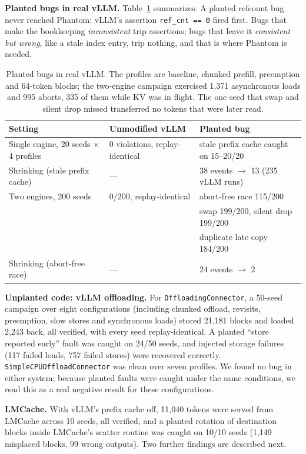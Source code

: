 \documentclass[10pt]{article}
\newcommand{\code}[1]{\texttt{\small #1}}
\begin{document}
\textbf{Planted bugs in real vLLM.} Table~\ref{tab:vllm} summarizes. A
planted refcount bug never reached Phantom: vLLM's assertion
\code{ref\_cnt == 0} fired first. Bugs that make the bookkeeping
\emph{inconsistent} trip assertions; bugs that leave it \emph{consistent but
wrong}, like a stale index entry, trip nothing, and that is where Phantom is
needed.

\begin{table}[h]
\centering\small
\begin{tabular}{lll}
\toprule
Setting & Unmodified vLLM & Planted bug \\
\midrule
Single engine, 20 seeds $\times$ 4 profiles & 0 violations, replay-identical & stale prefix cache caught on 15--20/20 \\
Shrinking (stale prefix cache) & --- & 38 events $\to$ 13 (235 vLLM runs) \\
Two engines, 200 seeds & 0/200, replay-identical & abort-free race 115/200 \\
 & & swap 199/200, silent drop 199/200 \\
 & & duplicate late copy 184/200 \\
Shrinking (abort-free race) & --- & 24 events $\to$ 2 \\
\bottomrule
\end{tabular}
\caption{Planted bugs in real vLLM. The profiles are baseline, chunked
prefill, preemption and 64-token blocks; the two-engine campaign exercised
1,371 asynchronous loads and 995 aborts, 335 of them while KV was in
flight. The one seed that swap and silent drop missed transferred no tokens
that were later read.}
\label{tab:vllm}
\end{table}

\textbf{Unplanted code: vLLM offloading.} For \code{OffloadingConnector}, a
50-seed campaign over eight configurations (including chunked offload,
revisits, preemption, slow stores and synchronous loads) stored 21,181
blocks and loaded 2,243 back, all verified, with every seed
replay-identical. A planted ``store reported early'' fault was caught on
24/50 seeds, and injected storage failures (117 failed loads, 757 failed
stores) were recovered correctly. \code{SimpleCPUOffloadConnector} was clean
over seven profiles. We found no bug in either system; because planted
faults were caught under the same conditions, we read this as a real
negative result for these configurations.

\textbf{LMCache.} With vLLM's prefix cache off, 11,040 tokens were served
from LMCache across 10 seeds, all verified, and a planted rotation of
destination blocks inside LMCache's scatter routine was caught on 10/10
seeds (1,149 misplaced blocks, 99 wrong outputs). Two further findings are
described next.
\end{document}
